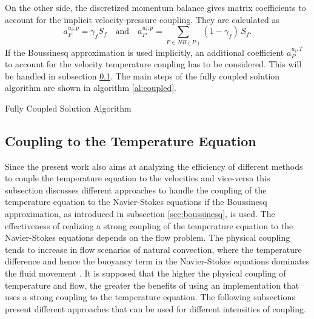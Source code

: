 On the other side, the discretized momentum balance gives matrix coefficients to account for the implicit velocity-pressure coupling. They are calculated as
\begin{displaymath}
  a_F^{u_i,p} =  \gamma_f S_f \quad \text{and} \quad a_P^{u_i,p} = \sum_{F \in NB(P)} (1-\gamma_f) \, S_f.
\end{displaymath}
If the Boussinesq approximation is used implicitly, an additional coefficient \(a_P^{u_i,T}\) to account for the velocity temperature coupling has to be considered. This will be handled in subsection \ref{sec:temperaturecoupling}. The main steps of the fully coupled solution algorithm are shown in algorithm \ref{al:coupled}.

\begin{algorithm}
\label{al:coupled}
\caption{Fully Coupled Solution Algorithm}
\begin{algorithmic}
\Else
\EndIf
{}
\EndIf
\EndWhile
\end{algorithmic}
\end{algorithm}

\subsection{Coupling to the Temperature Equation}
\label{sec:temperaturecoupling}

Since the present work also aims at analyzing the efficiency of different methods to couple the temperature equation to the velocities and vice-versa this subsection discusses different approaches to handle the coupling of the temperature equation to the Navier-Stokes equations if the Boussinesq approximation, as introduced in subsection \ref{sec:boussinesq}, is used. The effectiveness of realizing a strong coupling of the temperature equation to the Navier-Stokes equations depends on the flow problem. The physical coupling tends to increase in flow scenarios of natural convection, where the temperature difference and hence the buoyancy term in the Navier-Stokes equations dominates the fluid movement \cite{ferziger02}. It is supposed that the higher the physical coupling of temperature and flow, the greater the benefits of using an implementation that uses a strong coupling to the temperature equation. The following subsections present different approaches that can be used for different intensities of coupling.
      
